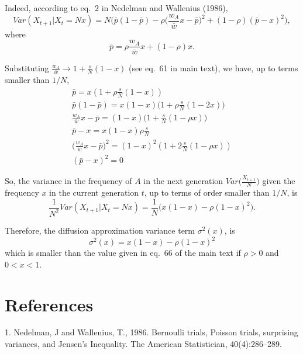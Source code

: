 \documentclass[11pt, oneside]{article}   	%
\begin{document}
Indeed, according to eq.~2 in Nedelman and Wallenius (1986), 
\begin{equation}
Var(X_{t+1}|X_t=Nx) = 
N \Big(\bar{p} (1-\bar{p}) - \rho\Big(\frac{w_A}{\bar{w}} x - \bar{p}\Big)^2 + (1-\rho)(\bar{p} - x)^2\Big),
\end{equation}
where
\begin{equation}
\bar{p} = \rho \frac{w_A}{\bar{w}} x + (1-\rho) x.
\end{equation}

Substituting $\frac{w_A}{\bar{w}} \to 1+\frac{s}{N}(1-x)$ (see eq.~61 in main text), we have, up to terms smaller than $1/N$,
\begin{align}
\bar{p} = 
	x(1 + \rho \frac{s}{N}(1-x))\\
\bar{p} (1-\bar{p} ) = 
	x(1-x)\Big(1 + \rho\frac{s}{N}(1-2x)\Big)\\
\frac{w_A}{\bar{w}} x - \bar{p} = 
	(1-x)\Big(1+\frac{s}{N}(1-\rho x)\Big) \\
\bar{p} - x = 
x (1-x) \rho \frac{s}{N} \\
	\Big(\frac{w_A}{\bar{w}} x - \bar{p}\Big)^2 = (1-x)^2(1 + 2\frac{s}{N}(1-\rho x)) \\
(\bar{p} - x)^2 = 0
\end{align}

So, the variance in the frequency of $A$ in the next generation $Var\Big(\frac{X_{t+1}}{N}\Big)$ given the frequency $x$ in the current generation $t$, up to terms of order smaller than $1/N$, is
\begin{equation}
\frac{1}{N^2}Var(X_{t+1}|X_t=Nx) = 
\frac{1}{N} \Big( x(1-x) - \rho (1-x)^2 \Big).
\end{equation}


Therefore, the diffusion approximation variance term $\sigma^2(x)$, is
\begin{equation}
\sigma^2(x) = x(1-x) - \rho (1-x)^2
\end{equation}
which is smaller than the value given in eq.~66 of the main text if $\rho>0$ and $0<x<1$. 

\section*{References}

1.  Nedelman, J and Wallenius, T., 1986. Bernoulli trials, Poisson trials, surprising variances, and Jensen’s Inequality. The American Statistician, 40(4):286–289.
\end{document}
